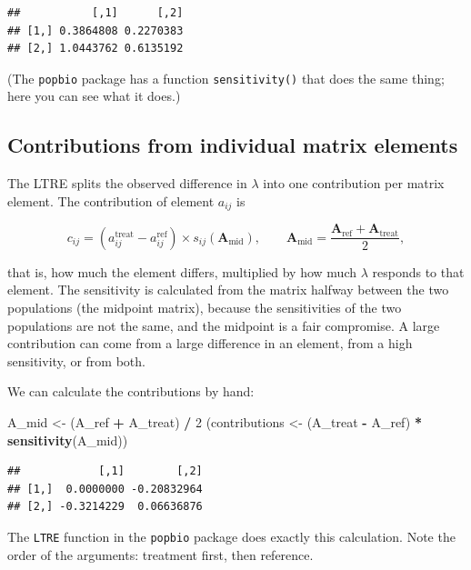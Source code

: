 \documentclass[
  a4paper]{book}
\newenvironment{Shaded}{\begin{snugshade}}{\end{snugshade}}
\newcommand{\DecValTok}[1]{\textcolor[rgb]{0.00,0.00,0.81}{#1}}
\newcommand{\FunctionTok}[1]{\textcolor[rgb]{0.13,0.29,0.53}{\textbf{#1}}}
\newcommand{\NormalTok}[1]{#1}
\newcommand{\OtherTok}[1]{\textcolor[rgb]{0.56,0.35,0.01}{#1}}
\newcommand{\SpecialCharTok}[1]{\textcolor[rgb]{0.81,0.36,0.00}{\textbf{#1}}}
\begin{document}
\begin{verbatim}
##           [,1]      [,2]
## [1,] 0.3864808 0.2270383
## [2,] 1.0443762 0.6135192
\end{verbatim}

(The \texttt{popbio} package has a function \texttt{sensitivity()} that does the same thing; here you can see what it does.)

\subsection{Contributions from individual matrix elements}\label{contributions-from-individual-matrix-elements}

The LTRE splits the observed difference in \(\lambda\) into one contribution per matrix element. The contribution of element \(a_{ij}\) is

\[
c_{ij} = \left(a_{ij}^{\mathrm{treat}} - a_{ij}^{\mathrm{ref}}\right) \times s_{ij}\left(\mathbf{A}_{\mathrm{mid}}\right), \qquad \mathbf{A}_{\mathrm{mid}} = \frac{\mathbf{A}_{\mathrm{ref}} + \mathbf{A}_{\mathrm{treat}}}{2},
\]

that is, how much the element differs, multiplied by how much \(\lambda\) responds to that element. The sensitivity is calculated from the matrix halfway between the two populations (the midpoint matrix), because the sensitivities of the two populations are not the same, and the midpoint is a fair compromise. A large contribution can come from a large difference in an element, from a high sensitivity, or from both.

We can calculate the contributions by hand:

\begin{Shaded}
\begin{Highlighting}[]
\NormalTok{A\_mid }\OtherTok{\textless{}{-}}\NormalTok{ (A\_ref }\SpecialCharTok{+}\NormalTok{ A\_treat) }\SpecialCharTok{/} \DecValTok{2}
\NormalTok{(contributions }\OtherTok{\textless{}{-}}\NormalTok{ (A\_treat }\SpecialCharTok{{-}}\NormalTok{ A\_ref) }\SpecialCharTok{*} \FunctionTok{sensitivity}\NormalTok{(A\_mid))}
\end{Highlighting}
\end{Shaded}

\begin{verbatim}
##            [,1]        [,2]
## [1,]  0.0000000 -0.20832964
## [2,] -0.3214229  0.06636876
\end{verbatim}

The \texttt{LTRE} function in the \texttt{popbio} package does exactly this calculation. Note the order of the arguments: treatment first, then reference.
\end{document}
